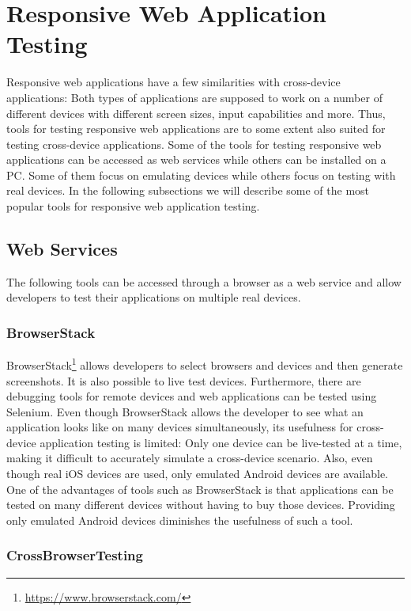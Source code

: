 \section{Responsive Web Application Testing}

Responsive web applications have a few similarities with cross-device applications: Both types of applications are supposed to work on a number of different devices with different screen sizes, input capabilities and more. Thus, tools for testing responsive web applications are to some extent also suited for testing cross-device applications. Some of the tools for testing responsive web applications can be accessed as web services while others can be installed on a PC. Some of them focus on emulating devices while others focus on testing with real devices. In the following subsections we will describe some of the most popular tools for responsive web application testing.

\subsection{Web Services}

The following tools can be accessed through a browser as a web service and allow developers to test their applications on multiple real devices.

\subsubsection{BrowserStack}

BrowserStack\footnote{\url{https://www.browserstack.com/}} allows developers to select browsers and devices and then generate screenshots. It is also possible to live test devices. Furthermore, there are debugging tools for remote devices and web applications can be tested using Selenium. Even though BrowserStack allows the developer to see what an application looks like on many devices simultaneously, its usefulness for cross-device application testing is limited: Only one device can be live-tested at a time, making it difficult to accurately simulate a cross-device scenario. Also, even though real iOS devices are used, only emulated Android devices are available. One of the advantages of tools such as BrowserStack is that applications can be tested on many different devices without having to buy those devices. Providing only emulated Android devices diminishes the usefulness of such a tool.

\subsubsection{CrossBrowserTesting}

